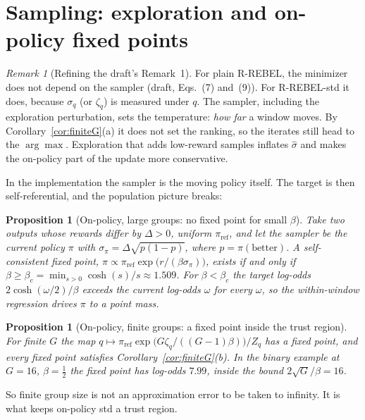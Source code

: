 \documentclass[11pt]{article}
\newtheorem{proposition}[theorem]{Proposition}
\theoremstyle{definition}
\theoremstyle{remark}
\newtheorem{remark}[theorem]{Remark}
\newcommand{\pref}{\pi_{\mathrm{ref}}}
\newcommand{\1}{\mathbb{1}}
\newcommand{\rr}{R-REBEL}
\newcommand{\rrs}{R-REBEL-std}
\begin{document}
\section{Sampling: exploration and on-policy fixed points}\label{sec:sampling}

\begin{remark}[Refining the draft's Remark~1]\label{rem:sampler}
For plain \rr{}, the minimizer does not depend on the sampler (draft, Eqs.~(7) and~(9)).
For \rrs{} it does, because $\sigma_q$ (or $\zeta_q$) is measured under $q$. The sampler,
including the exploration perturbation, sets the temperature: \emph{how far} a
window moves. By Corollary~\ref{cor:finiteG}(a) it does not set the ranking, so the
iterates still head to the $\arg\max$. Exploration that adds low-reward samples
inflates $\hat\sigma$ and makes the on-policy part of the update more conservative.
\end{remark}

In the implementation the sampler is the moving policy itself. The target is then
self-referential, and the population picture breaks:

\begin{proposition}[On-policy, large groups: no fixed point for small $\beta$]\label{prop:nofp}
Take two outputs whose rewards differ by $\Delta>0$, uniform $\pref$, and let the
sampler be the current policy $\pi$ with $\sigma_\pi=\Delta\sqrt{p(1-p)}$, where $p=\pi(\text{better})$.
A self-consistent fixed point, $\pi\propto\pref\exp\bigl(r/(\beta\sigma_\pi)\bigr)$, exists if and only if
$\beta\ge\beta_c=\min_{s>0}\cosh(s)/s\approx1.509$. For $\beta<\beta_c$ the target
log-odds $2\cosh(\omega/2)/\beta$ exceeds the current log-odds $\omega$ for every $\omega$, so
the within-window regression drives $\pi$ to a point mass.
\end{proposition}

\begin{proposition}[On-policy, finite groups: a fixed point inside the trust region]\label{prop:fp}
For finite $G$ the map $q\mapsto\pref\exp\bigl(G\zeta_q/((G-1)\beta)\bigr)/Z_q$ has a
fixed point, and every fixed point satisfies Corollary~\ref{cor:finiteG}(b).
In the binary example at $G=16$, $\beta=\tfrac12$ the fixed point has log-odds
$7.99$, inside the bound $2\sqrt G/\beta=16$.
\end{proposition}

So finite group size is not an approximation error to be taken to infinity. It is
what keeps on-policy std a trust region.
\end{document}
